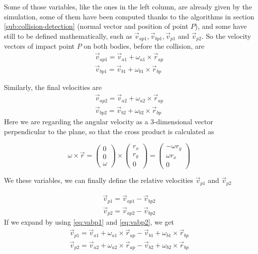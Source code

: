 Some of those variables, like the ones in the left column, are already given by
the simulation, some of them have been computed thanks to the algorithms in
section \ref{sub:collision-detection} (normal vector and position of point $P$),
and some have still to be defined mathematically, such as $\vec v_{ap1},\vec
	v_{bp1},\vec v_{p1}$ and $\vec v_{p2}$. So the velocity vectors of impact
point $P$ on both bodies, before the collision, are
\begin{equation} \label{eq:vabp1}
	\begin{split}
		\vec v_{ap1} = \vec v_{a1} + \omega_{a1} \times \vec r_{ap} \\
		\vec v_{bp1} = \vec v_{b1} + \omega_{b1} \times \vec r_{bp}
	\end{split}
\end{equation}

Similarly, the final velocities are
\begin{equation} \label{eq:vabp2}
	\begin{split}
		\vec v_{ap2} = \vec v_{a2} + \omega_{a2} \times \vec r_{ap}\\
		\vec v_{bp2} = \vec v_{b2} + \omega_{b2} \times \vec r_{bp}
	\end{split}
\end{equation}
Here we are regarding the angular velocity as a 3-dimensional vector
perpendicular to the plane, so that the cross product is calculated as

$$ \omega \times \vec r = \begin{pmatrix} 0\\0\\\omega \end{pmatrix} \times
	\begin{pmatrix} r_x\\r_y\\0 \end{pmatrix} = \begin{pmatrix} -\omega r_y \\
		\omega r_x  \\0\end{pmatrix}  $$

We these variables, we can finally define the relative velocities $\vec
	v_{p1}$ and $\vec v_{p2}$

\begin{equation}
	\label{eq:vp1}
	\begin{split}
		\vec v_{p1} = \vec v_{ap1} - \vec v_{bp2}\\
		\vec v_{p2} = \vec v_{ap2} - \vec v_{bp2}
	\end{split}
\end{equation}
If we expand by using \ref{eq:vabp1} and \ref{eq:vabp2}, we get
\begin{equation}
	\begin{split}
		\vec v_{p1} = \vec v_{a1} + \omega_{a1} \times \vec r_{ap} - \vec v_{b1}
		+ \omega_{b1} \times \vec r_{bp}\\
		\vec v_{p2} = \vec v_{a2} + \omega_{a2} \times \vec r_{ap} - \vec v_{b2} + \omega_{b2} \times \vec r_{bp}
	\end{split}
\end{equation}

